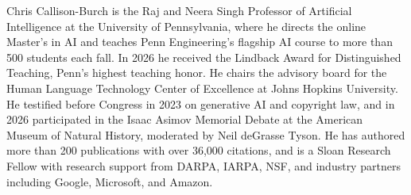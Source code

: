 Chris Callison-Burch is the Raj and Neera Singh Professor of Artificial
Intelligence at the University of Pennsylvania, where he directs the online
Master's in AI and teaches Penn Engineering's flagship AI course to more than
500 students each fall. In 2026 he received the Lindback Award for
Distinguished Teaching, Penn's highest teaching honor. He chairs the advisory
board for the Human Language Technology Center of Excellence at Johns Hopkins
University. He testified before Congress in 2023 on generative AI and copyright
law, and in 2026 participated in the Isaac Asimov Memorial Debate at the
American Museum of Natural History, moderated by Neil deGrasse Tyson. He has
authored more than 200 publications with over 36,000 citations, and is a Sloan
Research Fellow with research support from DARPA, IARPA, NSF, and industry
partners including Google, Microsoft, and Amazon.
